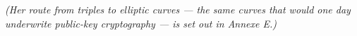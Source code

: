 % 
% 
% 
\textit{(Her route from triples to elliptic curves --- the same curves that would one day underwrite public-key cryptography --- is set out in Annexe E.)}

